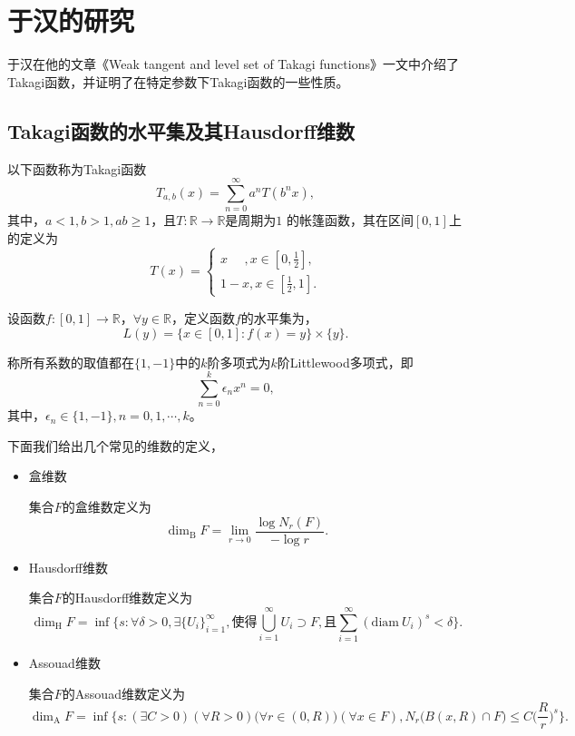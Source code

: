 \cleardoublepage

\section{于汉的研究}

于汉在他的文章《Weak tangent and level set of Takagi functions》一文中介绍了Takagi函数，并证明了在特定参数下Takagi函数的一些性质。


\subsection{Takagi函数的水平集及其Hausdorff维数}

\begin{definition}[Takagi 函数]
      以下函数称为Takagi函数
      $$
      T_{a,b}(x)=\sum_{n=0}^\infty a^nT(b^nx),
      $$
      其中，$a<1,b>1,ab\ge1$，且$T:\mathbb{R}\rightarrow\mathbb{R}$是周期为$1$ 的帐篷函数，其在区间$[0,1]$上的定义为
      $$
      T(x)=
      \begin{cases}
            x~~~~~~,x\in[0,\frac{1}{2}],\\
            1-x,x\in[\frac{1}{2},1].
      \end{cases}
      $$
\end{definition}



\begin{definition}[水平集]
    设函数$f:[0,1]\rightarrow\mathbb{R}$，$\forall y \in\mathbb{R}$，定义函数$f$的水平集为，
    $$
        L(y)=\{x\in[0,1]:f(x)=y\}\times\{y\}.
    $$
\end{definition}

\begin{definition}[Littlewood多项式]
      称所有系数的取值都在$\{1,-1\}$中的$k$阶多项式为$k$阶Littlewood多项式，即
      $$
      \sum_{n=0}^k\epsilon_nx^n=0,
      $$
      其中，$\epsilon_n\in\{1,-1\},n=0,1,\cdots,k$。
\end{definition}

下面我们给出几个常见的维数的定义，
\begin{itemize}

      \item 盒维数

      集合$F$的盒维数定义为
      $$
      \mathrm{\dim_B}F=\lim\limits_{r\rightarrow0}\frac{\log N_r(F)}{-\log r}.
      $$

      \item Hausdorff维数

      集合$F$的Hausdorff维数定义为
      $$
      \mathrm{\dim_H}F=\inf\Big\{s:\forall\delta>0,\exists\{U_i\}_{i=1}^\infty,\mbox{使得}\bigcup_{i=1}^\infty U_i\supset F,\mbox{且}\sum_{i=1}^\infty (\mathrm{diam}~U_i)^s<\delta\Big\}.
      $$

      \item Assouad维数

      集合$F$的Assouad维数定义为
      $$
      \mathrm{\dim_A}F=\inf\Big\{s:(\exists C>0)(\forall R>0)\big(\forall r\in(0,R)\big)(\forall x\in F),N_r\big(B(x,R)\cap F\big)\le C\Big(\frac{R}{r}\Big)^s\Big\}.
      $$

\end{itemize}



